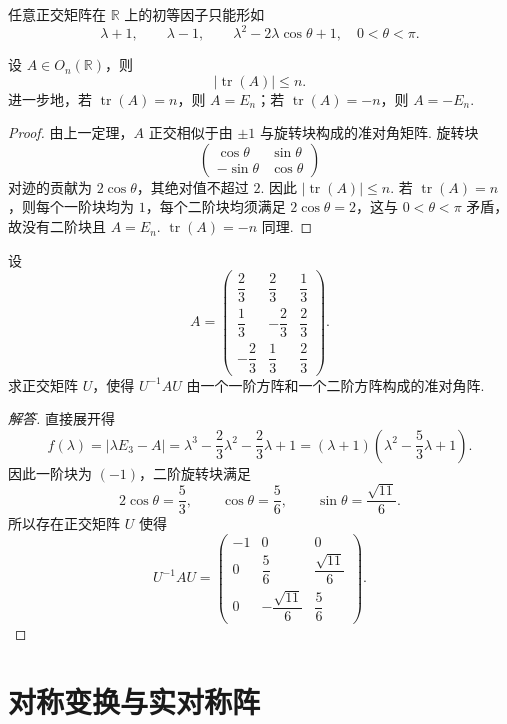 \begin{corollary}
	任意正交矩阵在 $\mathbb{R}$ 上的初等因子只能形如
	\[
	\lambda+1,
	\qquad
	\lambda-1,
	\qquad
	\lambda^2-2\lambda\cos\theta+1,
	\quad 0<\theta<\pi.
	\]
\end{corollary}

\begin{example}
	设 $A\in O_n(\mathbb{R})$，则
	\[
	|\operatorname{tr}(A)|\leqslant n.
	\]
	进一步地，若 $\operatorname{tr}(A)=n$，则 $A=E_n$；若 $\operatorname{tr}(A)=-n$，则 $A=-E_n$.
\end{example}
\begin{proof}
	由上一定理，$A$ 正交相似于由 $\pm1$ 与旋转块构成的准对角矩阵. 旋转块
	\[
	\begin{pmatrix}\cos\theta&\sin\theta\\-\sin\theta&\cos\theta\end{pmatrix}
	\]
	对迹的贡献为 $2\cos\theta$，其绝对值不超过 $2$. 因此 $|\operatorname{tr}(A)|\leq n$. 若 $\operatorname{tr}(A)=n$，则每个一阶块均为 $1$，每个二阶块均须满足 $2\cos\theta=2$，这与 $0<\theta<\pi$ 矛盾，故没有二阶块且 $A=E_n$. $\operatorname{tr}(A)=-n$ 同理.
\end{proof}

\begin{example}
	设
	\[
	A=\begin{pmatrix}
		\dfrac23&\dfrac23&\dfrac13\\[4pt]
		\dfrac13&-\dfrac23&\dfrac23\\[4pt]
		-\dfrac23&\dfrac13&\dfrac23
	\end{pmatrix}.
	\]
	求正交矩阵 $U$，使得 $U^{-1}AU$ 由一个一阶方阵和一个二阶方阵构成的准对角阵.
\end{example}
\begin{proof}[解答]
	直接展开得
	\[
	f(\lambda)=|\lambda E_3-A|
	=\lambda^3-\frac23\lambda^2-\frac23\lambda+1
	=(\lambda+1)\left(\lambda^2-\frac53\lambda+1\right).
	\]
	因此一阶块为 $(-1)$，二阶旋转块满足
	\[
	2\cos\theta=\frac53,
	\qquad
	\cos\theta=\frac56,
	\qquad
	\sin\theta=\frac{\sqrt{11}}6.
	\]
	所以存在正交矩阵 $U$ 使得
	\[
	U^{-1}AU=\begin{pmatrix}
		-1&0&0\\
		0&\dfrac56&\dfrac{\sqrt{11}}6\\[4pt]
		0&-\dfrac{\sqrt{11}}6&\dfrac56
	\end{pmatrix}.
	\]
\end{proof}


\section{对称变换与实对称阵}


